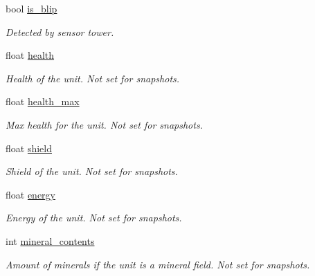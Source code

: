 \begin{DoxyCompactItemize}
bool \hyperlink{classsc2_1_1_unit_aa730ea2bf474d4422e6c6a1e267945d4}{is\+\_\+blip}
\begin{DoxyCompactList}\small\item\em Detected by sensor tower. \end{DoxyCompactList}\item 
\mbox{\label{classsc2_1_1_unit_a7049529d7ec06419b85121a384949abf}} 
float \hyperlink{classsc2_1_1_unit_a7049529d7ec06419b85121a384949abf}{health}
\begin{DoxyCompactList}\small\item\em Health of the unit. Not set for snapshots. \end{DoxyCompactList}\item 
\mbox{\label{classsc2_1_1_unit_a9903ceca120d82cacc49dee00150fe67}} 
float \hyperlink{classsc2_1_1_unit_a9903ceca120d82cacc49dee00150fe67}{health\+\_\+max}
\begin{DoxyCompactList}\small\item\em Max health for the unit. Not set for snapshots. \end{DoxyCompactList}\item 
\mbox{\label{classsc2_1_1_unit_ae5ee0c4d31a1266e31ac0a739bcc3d86}} 
float \hyperlink{classsc2_1_1_unit_ae5ee0c4d31a1266e31ac0a739bcc3d86}{shield}
\begin{DoxyCompactList}\small\item\em Shield of the unit. Not set for snapshots. \end{DoxyCompactList}\item 
\mbox{\label{classsc2_1_1_unit_aa2b194b8a5499b7591356dc6365c0cdc}} 
float \hyperlink{classsc2_1_1_unit_aa2b194b8a5499b7591356dc6365c0cdc}{energy}
\begin{DoxyCompactList}\small\item\em Energy of the unit. Not set for snapshots. \end{DoxyCompactList}\item 
\mbox{\label{classsc2_1_1_unit_a689d7b7c9a68b3cd172f2333203423b9}} 
int \hyperlink{classsc2_1_1_unit_a689d7b7c9a68b3cd172f2333203423b9}{mineral\+\_\+contents}
\begin{DoxyCompactList}\small\item\em Amount of minerals if the unit is a mineral field. Not set for snapshots. \end{DoxyCompactList}\item 

\end{DoxyCompactItemize}
